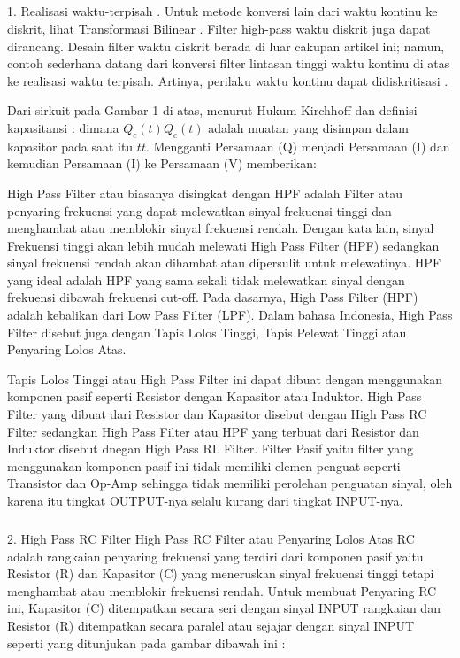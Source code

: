 \documentclass[12pt,a4paper]{article}
\begin{document}
\subparagraph{ }
1. Realisasi waktu-terpisah .
Untuk metode konversi lain dari waktu kontinu ke diskrit, lihat Transformasi Bilinear .
Filter high-pass waktu diskrit juga dapat dirancang. Desain filter waktu diskrit berada di luar cakupan artikel ini; namun, contoh sederhana datang dari konversi filter lintasan tinggi waktu kontinu di atas ke realisasi waktu terpisah. Artinya, perilaku waktu kontinu dapat didiskritisasi .

Dari sirkuit pada Gambar 1 di atas, menurut Hukum Kirchhoff dan definisi kapasitansi :
dimana ${ Q_ {c} (t)}Q_c (t)$ 
 adalah muatan yang disimpan dalam kapasitor pada saat itu ${t}t.$
 Mengganti Persamaan (Q) menjadi Persamaan (I) dan kemudian Persamaan (I) ke Persamaan (V) memberikan:
 
 High Pass Filter atau biasanya disingkat dengan HPF adalah Filter atau penyaring frekuensi yang dapat melewatkan sinyal frekuensi tinggi dan menghambat atau memblokir sinyal frekuensi rendah. Dengan kata lain, sinyal Frekuensi tinggi akan lebih mudah melewati High Pass Filter (HPF) sedangkan sinyal frekuensi rendah akan dihambat atau dipersulit untuk melewatinya. HPF yang ideal adalah HPF yang sama sekali tidak melewatkan sinyal dengan frekuensi dibawah frekuensi cut-off. Pada dasarnya, High Pass Filter (HPF) adalah kebalikan dari Low Pass Filter (LPF). Dalam bahasa Indonesia, High Pass Filter disebut juga dengan Tapis Lolos Tinggi, Tapis Pelewat Tinggi atau Penyaring Lolos Atas.


 
Tapis Lolos Tinggi atau High Pass Filter ini dapat dibuat dengan menggunakan komponen pasif seperti Resistor dengan Kapasitor atau Induktor. High Pass Filter yang dibuat dari Resistor dan Kapasitor disebut dengan High Pass RC Filter sedangkan High Pass Filter atau HPF yang terbuat dari Resistor dan Induktor disebut dnegan High Pass RL Filter. Filter Pasif yaitu filter yang menggunakan komponen pasif ini tidak memiliki elemen penguat seperti Transistor dan Op-Amp sehingga tidak memiliki perolehan penguatan sinyal, oleh karena itu tingkat OUTPUT-nya selalu kurang dari tingkat INPUT-nya.


\subparagraph{ }
2. High Pass RC Filter
High Pass RC Filter atau Penyaring Lolos Atas RC adalah rangkaian penyaring frekuensi yang terdiri dari komponen pasif yaitu Resistor (R) dan Kapasitor (C) yang meneruskan sinyal frekuensi tinggi tetapi menghambat atau memblokir frekuensi rendah. Untuk membuat Penyaring RC ini, Kapasitor (C) ditempatkan secara seri dengan sinyal INPUT rangkaian dan Resistor (R) ditempatkan secara paralel atau sejajar dengan sinyal INPUT seperti yang ditunjukan pada gambar dibawah ini :
\end{document}
